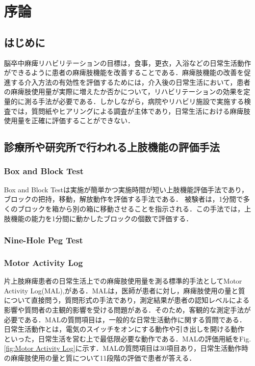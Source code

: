 \chapter{序論}

\section{はじめに}
脳卒中麻痺リハビリテーションの目標は，食事，更衣，入浴などの日常生活動作ができるように患者の麻痺肢機能を改善することである．麻痺肢機能の改善を促進する介入方法の有効性を評価するためには，介入後の日常生活において，患者の麻痺肢使用量が実際に増えたか否かについて，リハビリテーションの効果を定量的に測る手法が必要である．しかしながら，病院やリハビリ施設で実施する検査では，質問紙やヒアリングによる調査が主体であり，日常生活における麻痺肢使用量を正確に評価することができない．\\

\section{診療所や研究所で行われる上肢機能の評価手法}

\subsection*{Box and Block Test}
Box and Block Testは実施が簡単かつ実施時間が短い上肢機能評価手法であり，ブロックの把持，移動，解放動作を評価する手法である．
被験者は，1分間で多くのブロックを箱から別の箱に移動させることを指示される．この手法では，上肢機能の能力を1分間に動かしたブロックの個数で評価する．


\subsection*{Nine-Hole Peg Test}


\subsection*{Motor Activity Log}

片上肢麻痺患者の日常生活上での麻痺肢使用量を測る標準的手法としてMotor Activity Log(MAL)\cite{Taub2006},\cite{Uswatte2005}がある．MALは，医師が患者に対し，麻痺肢使用の量と質について直接問う，質問形式の手法であり，測定結果が患者の認知レベルによる影響や質問者の主観的影響を受ける問題がある．そのため，客観的な測定手法が必要である．MALの質問項目は，一般的な日常生活動作に関する質問である．日常生活動作とは，電気のスイッチをオンにする動作や引き出しを開ける動作といった，日常生活を営む上で最低限必要な動作である．MALの評価用紙をFig.\ref{fig:Motor Activity Log}に示す．MALの質問項目は30項目あり，日常生活動作時の麻痺肢使用の量と質について11段階の評価で患者が答える．

